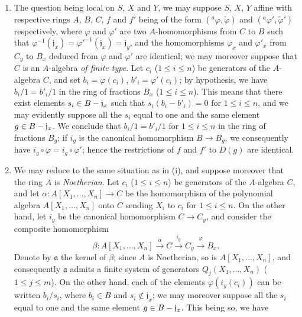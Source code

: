\begin{enumerate}
  \item[(i)] The question being local on $S$, $X$ and $Y$, we may suppose
    $S$, $X$, $Y$ affine with respective rings $A$, $B$, $C$, $f$ and $f'$
    being of the form $({}^a\varphi,\widetilde{\varphi})$ and
    $({}^a\varphi',\widetilde{\varphi}')$ respectively, where $\varphi$ and
    $\varphi'$ are two $A$-homomorphisms from $C$ to $B$ such that
    $\varphi^{-1}(\mathfrak{j}_x)={\varphi'}^{-1}(\mathfrak{j}_x)
    =\mathfrak{j}_y$, and the homomorphisms $\varphi_x$ and $\varphi'_x$ from
    $C_y$ to $B_x$ deduced from $\varphi$ and $\varphi'$ are identical;
    we may moreover suppose that $C$ is an $A$-algebra \emph{of finite type}. Let
    $c_i$ ($1\leq i\leq n$) be generators of the $A$-algebra $C$, and set
    $b_i=\varphi(c_i)$, $b'_i=\varphi'(c_i)$; by hypothesis, we have
    $b_i/1=b'_i/1$ in the ring of fractions $B_x$ ($1\leq i\leq n$). This
    means that there exist elements $s_i\in B-\mathfrak{j}_x$ such that
    $s_i(b_i-b'_i)=0$ for $1\leq i\leq n$, and we may evidently suppose
    all the $s_i$ equal to one and the same element $g\in B-\mathfrak{j}_x$. We
    conclude that $b_i/1=b'_i/1$ for $1\leq i\leq n$ in the ring of
    fractions $B_g$; if $i_g$ is the canonical homomorphism $B\to B_g$, we
    consequently have $i_g\circ\varphi=i_g\circ\varphi'$; hence the
    restrictions of $f$ and $f'$ to $D(g)$ are identical.
  \item[(ii)] We may reduce to the same situation as in (i), and suppose
    moreover that the ring $A$ is \emph{Noetherian}. Let $c_i$
    ($1\leq i\leq n$) be generators of the $A$-algebra $C$, and let
    $\alpha:A[X_1,\ldots,X_n]\to C$ be the homomorphism of the polynomial
    algebra $A[X_1,\ldots,X_n]$ onto $C$ sending $X_i$ to $c_i$ for
    $1\leq i\leq n$. On the other hand, let $i_y$ be the canonical homomorphism
    $C\to C_y$, and consider the composite homomorphism
    \[
      \beta:A[X_1,\ldots,X_n]
      \xrightarrow{\alpha} C
      \xrightarrow{i_y} C_y
      \xrightarrow{\varphi} B_x.
    \]
    Denote by $\mathfrak{a}$ the kernel of $\beta$; since $A$ is
    Noetherian, so is $A[X_1,\ldots,X_n]$, and consequently
    $\mathfrak{a}$ admits a finite system of generators
    $Q_j(X_1,\ldots,X_n)$ ($1\leq j\leq m$). On the other hand, each of the
    elements $\varphi(i_y(c_i))$ can be written $b_i/s_i$, where $b_i\in B$ and
    $s_i\notin\mathfrak{j}_x$; we may moreover suppose all the $s_i$ equal
    to one and the same element $g\in B-\mathfrak{j}_x$. This being so, we have

\end{enumerate}
